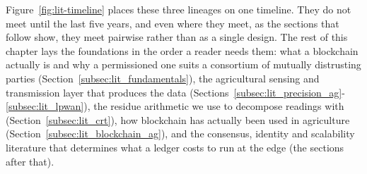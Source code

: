 \documentclass[12pt,a4paper,oneside]{book}
\begin{document}
Figure~\ref{fig:lit-timeline} places these three lineages on one timeline.
They do not meet until the last five years, and even where they meet, as the
sections that follow show, they meet pairwise rather than as a single
design. The rest of this chapter lays the foundations in the order a reader
needs them: what a blockchain actually is and why a permissioned one suits a
consortium of mutually distrusting parties (Section~\ref{subsec:lit_fundamentals}),
the agricultural sensing and transmission layer that produces the data
(Sections~\ref{subsec:lit_precision_ag}-\ref{subsec:lit_lpwan}), the residue
arithmetic we use to decompose readings with
(Section~\ref{subsec:lit_crt}), how blockchain has actually been used in
agriculture (Section~\ref{subsec:lit_blockchain_ag}), and the consensus,
identity and scalability literature that determines what a ledger costs to
run at the edge (the sections after that).
\end{document}
